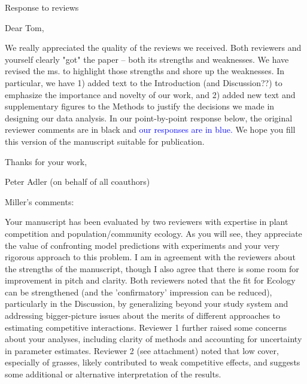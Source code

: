 \documentclass[12pt]{article}
\newcommand{\response}{\textcolor{blue}}
\begin{document}
 
\centerline{\large{Response to reviews}} 


\normalsize 

Dear Tom,

We really appreciated the quality of the reviews we received. Both reviewers and yourself clearly "got" the paper -- both its strengths and weaknesses. We have revised the ms. to highlight those strengths and shore up the weaknesses. In particular, we have 1) added text to the Introduction (and Discussion??) to emphasize the importance and novelty of our work, and 2) added new text and supplementary figures to the Methods to justify the decisions we made in designing our data analysis. In our point-by-point response below, the original reviewer comments are in black and \response{our responses are in blue.} We hope you fill this version of the manuscript suitable for publication.

Thanks for your work,

Peter Adler (on behalf of all coauthors)

Miller's comments: 

Your manuscript has been evaluated by two reviewers with expertise in plant competition and population/community ecology. As you will see, they appreciate the value of confronting model predictions with experiments and your very rigorous approach to this problem. I am in agreement with the reviewers about the strengths of the manuscript, though I also agree that there is some room for improvement in pitch and clarity. Both reviewers noted that the fit for Ecology can be strengthened (and the 'confirmatory' impression can be reduced), particularly in the Discussion, by generalizing beyond your study system and addressing bigger-picture issues about the merits of different approaches to estimating competitive interactions. Reviewer 1 further raised some concerns about your analyses, including clarity of methods and accounting for uncertainty in parameter estimates. Reviewer 2 (see attachment) noted that low cover, especially of grasses, likely contributed to weak competitive effects, and suggests some additional or alternative interpretation of the results. 
\end{document}
